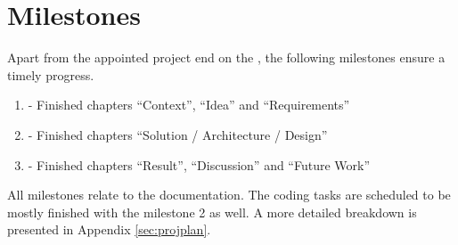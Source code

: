 \section{Milestones}

Apart from the appointed project end on the , the following milestones ensure a timely progress.

\begin{enumerate}
\item \textbf{} - Finished chapters \enquote{Context}, \enquote{Idea} and \enquote{Requirements}
\item \textbf{} - Finished chapters \enquote{Solution / Architecture / Design}
\item \textbf{} - Finished chapters \enquote{Result}, \enquote{Discussion} and \enquote{Future Work}
\end{enumerate}

All milestones relate to the documentation. The coding tasks are scheduled to be mostly finished with the milestone 2 as well. A more detailed breakdown is presented in Appendix \ref{sec:projplan}.